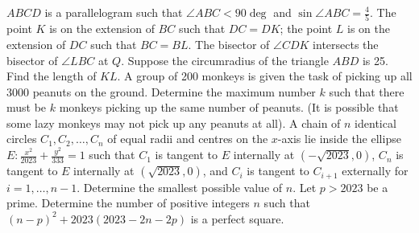 \begin{enumerate}
    \hyperrefitem[A::2023-O-1-22] $ABCD$ is a parallelogram such that $\angle ABC < 90\deg$ and $\sin \angle ABC = \frac45$. The point $K$ is on the extension of $BC$ such that $DC = DK$; the point $L$ is on the extension of $DC$ such that $BC = BL$. The bisector of $\angle CDK$ intersects the bisector of $\angle LBC$ at $Q$. Suppose the circumradius of the triangle $ABD$ is 25. Find the length of $KL$.
    \hyperrefitem[A::2023-O-1-23] A group of 200 monkeys is given the task of picking up all 3000 peanuts on the ground. Determine the maximum number $k$ such that there must be $k$ monkeys picking up the same number of peanuts. (It is possible that some lazy monkeys may not pick up any peanuts at all).
    \hyperrefitem[A::2023-O-1-24] A chain of $n$ identical circles $C_1, C_2, \ldots, C_n$ of equal radii and centres on the $x$-axis lie inside the ellipse $E: \frac{x^2}{2023} + \frac{y^2}{333} = 1$ such that $C_1$ is tangent to $E$ internally at $(-\sqrt{2023}, 0)$, $C_n$ is tangent to $E$ internally at $(\sqrt{2023}, 0)$, and $C_i$ is tangent to $C_{i+1}$ externally for $i = 1, \ldots , n-1$. Determine the smallest possible value of $n$.
    \hyperrefitem[A::2023-O-1-25] Let $p > 2023$ be a prime. Determine the number of positive integers $n$ such that $(n-p)^2 + 2023(2023 - 2n - 2p)$ is a perfect square.
\end{enumerate}
